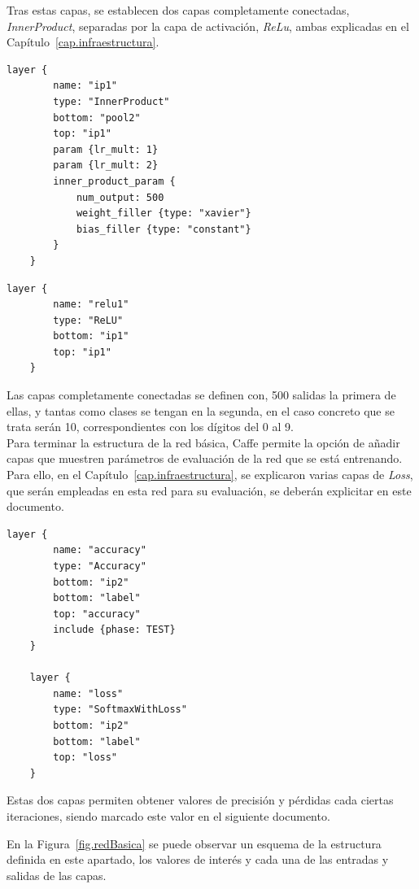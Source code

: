 \begin{description}
	Tras estas capas, se establecen dos capas completamente conectadas, \textit{InnerProduct}, separadas por la capa de activación, \textit{ReLu}, ambas explicadas en el Capítulo~\ref{cap.infraestructura}. 
	\vspace{5pt}
	\begin{lstlisting}[frame=single]
	layer {
		name: "ip1"
		type: "InnerProduct"
		bottom: "pool2"
		top: "ip1"
		param {lr_mult: 1}
		param {lr_mult: 2}
		inner_product_param {
			num_output: 500
			weight_filler {type: "xavier"}
			bias_filler {type: "constant"}
		}
	}	
	\end{lstlisting}
	
	\begin{lstlisting}[frame=single]
	layer {
		name: "relu1"
		type: "ReLU"
		bottom: "ip1"
		top: "ip1"
	}	
	\end{lstlisting}
	
	Las capas completamente conectadas se definen con, 500 salidas la primera de ellas, y tantas como clases se tengan en la segunda, en el caso concreto que se trata serán 10, correspondientes con los dígitos del 0 al 9.\\
	
	Para terminar la estructura de la red básica, Caffe permite la opción de añadir capas que muestren parámetros de evaluación de la red que se está entrenando. Para ello, en el Capítulo~\ref{cap.infraestructura}, se explicaron varias capas de \textit{Loss}, que serán empleadas en esta red para su evaluación, se deberán explicitar en este documento.
	\vspace{5pt}
	\begin{lstlisting}[frame=single]
	layer {
		name: "accuracy"
		type: "Accuracy"
		bottom: "ip2"
		bottom: "label"
		top: "accuracy"
		include {phase: TEST}
	}
	
	layer {
		name: "loss"
		type: "SoftmaxWithLoss"
		bottom: "ip2"
		bottom: "label"
		top: "loss"
	}	
	\end{lstlisting}
	
	Estas dos capas permiten obtener valores de precisión y pérdidas cada ciertas iteraciones, siendo marcado este valor en el siguiente documento.
	
	En la Figura~\ref{fig.redBasica} se puede observar un esquema de la estructura definida en este apartado, los valores de interés y cada una de las entradas y salidas de las capas.
	

\end{description}
